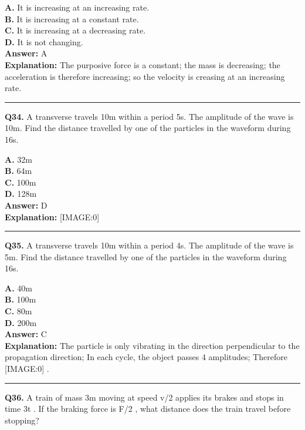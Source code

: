 \documentclass[12pt]{article}
\begin{document}
\textbf{A.} It is increasing at an increasing rate. \\
\textbf{B.} It is increasing at a constant rate. \\
\textbf{C.} It is increasing at a decreasing rate. \\
\textbf{D.} It is not changing. \\

\textbf{Answer:} A \\
\textbf{Explanation:} The purposive force is a constant; the mass is decreasing; the acceleration is therefore increasing; so the velocity is creasing at an increasing rate.

\hrule
\vspace{1em}


\noindent
\textbf{Q34.} A transverse travels 10m within a period 5s. The amplitude of the wave is 10m. Find the distance travelled by one of the particles in the waveform during 16s.



\textbf{A.} 32m \\
\textbf{B.} 64m \\
\textbf{C.} 100m \\
\textbf{D.} 128m \\

\textbf{Answer:} D \\
\textbf{Explanation:} [IMAGE:0]

\hrule
\vspace{1em}


\noindent
\textbf{Q35.} A transverse travels 10m within a period 4s. The amplitude of the wave is 5m. Find the distance travelled by one of the particles in the waveform during 16s.



\textbf{A.} 40m \\
\textbf{B.} 100m \\
\textbf{C.} 80m \\
\textbf{D.} 200m \\

\textbf{Answer:} C \\
\textbf{Explanation:} The particle is only vibrating in the direction perpendicular to the propagation direction; In each cycle, the object passes 4 amplitudes; Therefore
[IMAGE:0]
.

\hrule
\vspace{1em}


\noindent
\textbf{Q36.} A train of mass 3m
moving at speed v/2
applies its brakes and stops in time 3t
. If the braking force is F/2
, what distance does the train travel before stopping?
\end{document}
